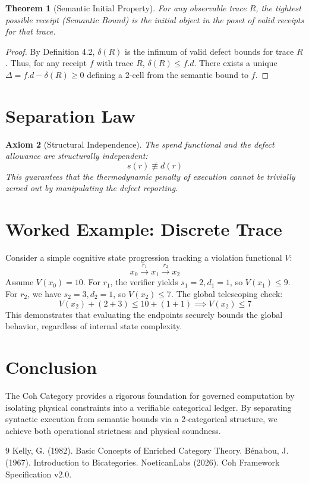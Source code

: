 \documentclass[11pt]{article}
\newtheorem{theorem}{Theorem}[section]
\newtheorem{axiom}[theorem]{Axiom}
\begin{document}
\begin{theorem}[Semantic Initial Property]
For any observable trace $R$, the tightest possible receipt (Semantic Bound) is the initial object in the poset of valid receipts for that trace.
\end{theorem}
\begin{proof}
By Definition 4.2, $\delta(R)$ is the infimum of valid defect bounds for trace $R$. Thus, for any receipt $f$ with trace $R$, $\delta(R) \le f.d$. There exists a unique $\Delta = f.d - \delta(R) \ge 0$ defining a 2-cell from the semantic bound to $f$.
\end{proof}

\section{Separation Law}

\begin{axiom}[Structural Independence]
The spend functional and the defect allowance are structurally independent:
\[
s(r) \not\equiv d(r)
\]
This guarantees that the thermodynamic penalty of execution cannot be trivially zeroed out by manipulating the defect reporting.
\end{axiom}

\section{Worked Example: Discrete Trace}

Consider a simple cognitive state progression tracking a violation functional $V$:
\[
x_0 \xrightarrow{r_1} x_1 \xrightarrow{r_2} x_2
\]
Assume $V(x_0) = 10$. For $r_1$, the verifier yields $s_1=2, d_1=1$, so $V(x_1) \le 9$. For $r_2$, we have $s_2=3, d_2=1$, so $V(x_2) \le 7$. 
The global telescoping check:
\[
V(x_2) + (2 + 3) \le 10 + (1 + 1) \implies V(x_2) \le 7
\]
This demonstrates that evaluating the endpoints securely bounds the global behavior, regardless of internal state complexity.

\section{Conclusion}

The Coh Category provides a rigorous foundation for governed computation by isolating physical constraints into a verifiable categorical ledger. By separating syntactic execution from semantic bounds via a 2-categorical structure, we achieve both operational strictness and physical soundness.

\begin{thebibliography}{9}
 Kelly, G. (1982). Basic Concepts of Enriched Category Theory.
 Bénabou, J. (1967). Introduction to Bicategories.
 NoeticanLabs (2026). Coh Framework Specification v2.0.
\end{thebibliography}
\end{document}
